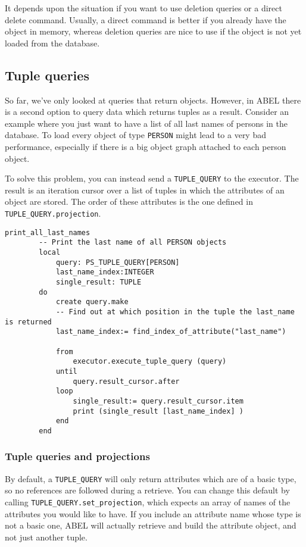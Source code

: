 It depends upon the situation if you want to use deletion queries or a direct delete command. 
Usually, a direct command is better if you already have the object in memory, whereas deletion queries are nice to use if the object is not yet loaded from the database.

\subsection{Tuple queries}

So far, we've only looked at queries that return objects. However, in ABEL there is a second option to query data which returns tuples as a result.
Consider an example where you just want to have a list of all last names of persons in the database. 
To load every object of type \lstinline!PERSON! might lead to a very bad performance, especially if there is a big object graph attached to each person object.

To solve this problem, you can instead send a \lstinline!TUPLE_QUERY! to the executor. 
The result is an iteration cursor over a list of tuples in which the attributes of an object are stored. The order of these attributes is the one defined in \lstinline!TUPLE_QUERY.projection!.

\begin{lstlisting}[language=OOSC2Eiffel, captionpos=b, caption={}, label={lst:tuple_query_simple}]
	print_all_last_names
		-- Print the last name of all PERSON objects
		local
			query: PS_TUPLE_QUERY[PERSON]
			last_name_index:INTEGER
			single_result: TUPLE
		do
			create query.make
			-- Find out at which position in the tuple the last_name is returned
			last_name_index:= find_index_of_attribute("last_name")

			from
				executor.execute_tuple_query (query)
			until
				query.result_cursor.after
			loop
				single_result:= query.result_cursor.item
				print (single_result [last_name_index] )
			end			
		end
\end{lstlisting}

\subsubsection{Tuple queries and projections}
By default, a \lstinline!TUPLE_QUERY! will only return attributes which are of a basic type, so no references are followed during a retrieve.
You can change this default by calling \lstinline!TUPLE_QUERY.set_projection!, which expects an array of names of the attributes you would like to have.
If you include an attribute name whose type is not a basic one, ABEL will actually retrieve and build the attribute object, and not just another tuple.


